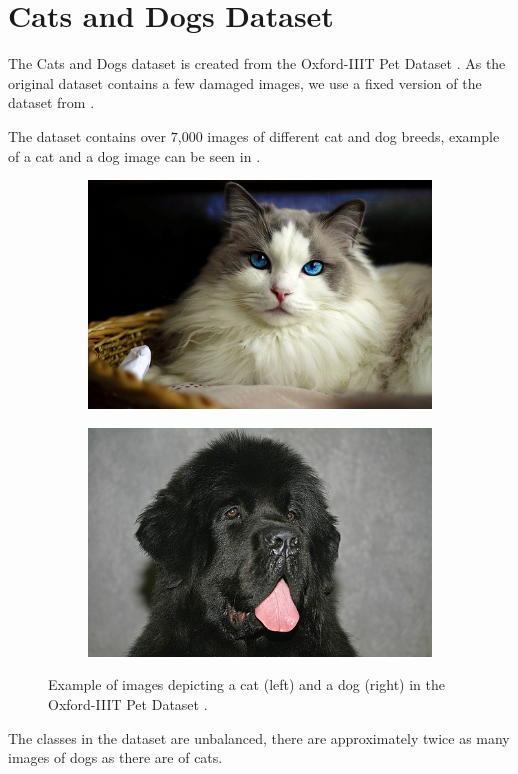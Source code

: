 \section{Cats and Dogs Dataset}\label{sec:cat_dog_dataset}
The Cats and Dogs dataset is created from the Oxford-IIIT Pet Dataset \cite{parkhi12a}. As the original dataset contains a few damaged images, we use a fixed version of the dataset from \cite{ml4py_dataset}.

The dataset contains over $7$,$000$ images of different cat and dog breeds, example of a cat and a dog image can be seen in .
\begin{figure}[!ht]
    \centering
    \begin{subfigure}[t]{0.45\textwidth}
        \includegraphics[width=\textwidth]{Figures/datasets/cat.jpg}
        \label{fig:original:example_cat}
    \end{subfigure}\hfill
    \begin{subfigure}[t]{0.45\textwidth}
        \includegraphics[width=\textwidth]{Figures/datasets/dog.jpg}
        \label{fig:original:example_dog}
    \end{subfigure}
    \caption[Example of images depicting a cat (left) and a dog (right) in the Oxford-IIIT Pet Dataset]{Example of images depicting a cat (left) and a dog (right) in the Oxford-IIIT Pet Dataset \cite{parkhi12a}.}
    \label{fig:iiit_pet}
\end{figure}
The classes in the dataset are unbalanced, there are approximately twice as many images of dogs as there are of cats.

